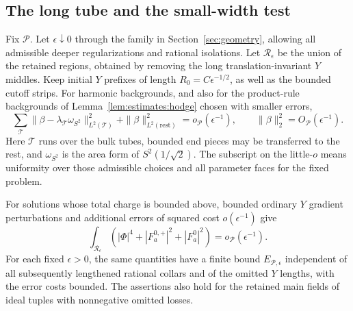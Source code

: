 \subsection{The long tube and the small-width test}

\begin{proposition}
\label{prop:estimates:energy}
Fix $\mathcal P$.  Let $\epsilon\downarrow0$ through the family in
Section~\ref{sec:geometry}, allowing all admissible deeper
regularizations and rational isolations.  Let $\mathcal R_\epsilon$
be the union of the retained regions, obtained by removing the long
translation-invariant $Y$ middles.  Keep initial $Y$ prefixes of
length $R_0=C\epsilon^{-1/2}$, as well as the bounded cutoff strips.
For harmonic backgrounds, and also for the product-rule backgrounds
of Lemma~\ref{lem:estimates:hodge} chosen with smaller errors,
\begin{equation}
 \sum_{\mathcal T}\|\beta-\lambda_{\mathcal T}\omega_{S^2}\|_{L^2(\mathcal T)}^2
   +\|\beta\|_{L^2(\mathrm{rest})}^2=o_{\mathcal P}(\epsilon^{-1}),
 \qquad \|\beta\|_2^2=O_{\mathcal P}(\epsilon^{-1}).
 \label{eq:estimates:tube-background}
\end{equation}
Here $\mathcal T$ runs over the bulk tubes, bounded end pieces may be
transferred to the rest, and $\omega_{S^2}$ is the area form of
$S^2(1/\sqrt2)$.  The subscript on the little-$o$ means uniformity
over those admissible choices and all parameter faces for the fixed
problem.

For solutions whose total charge is bounded above, bounded ordinary
$Y$ gradient perturbations and additional errors of squared cost
$o(\epsilon^{-1})$ give
\begin{equation}
 \int_{\mathcal R_\epsilon}
       (|\Phi|^4+|F_a^{0,+}|^2+|F_a^0|^2)
                  =o_{\mathcal P}(\epsilon^{-1}).
 \label{eq:estimates:small-energy}
\end{equation}
For each fixed $\epsilon>0$, the same quantities have a finite bound
$E_{\mathcal P,\epsilon}$ independent of all subsequently lengthened
rational collars and of the omitted $Y$ lengths, with the error
costs bounded.  The assertions also hold for the retained main fields
of ideal tuples with nonnegative omitted losses.
\end{proposition}

